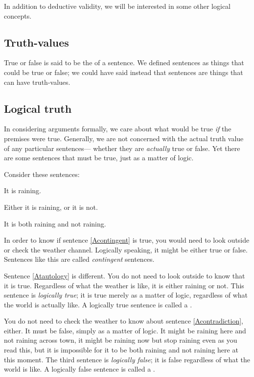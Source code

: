 In addition to deductive validity, we will be interested in some other logical concepts.

\subsection{Truth-values}
True or false is said to be the  of a sentence. We defined sentences as things that could be true or false; we could have said instead that sentences are things that can have truth-values.

\subsection{Logical truth}

In considering arguments formally, we care about what would be true \emph{if} the premises were true. Generally, we are not concerned with the actual truth value of any particular sentences--- whether they are \emph{actually} true or false. Yet there are some sentences that must be true, just as a matter of logic.

Consider these sentences:
\begin{earg}
\item[\ex{Acontingent}] It is raining.
\item[\ex{Atautology}] Either it is raining, or it is not.
\item[\ex{Acontradiction}] It is both raining and not raining.
\end{earg}
In order to know if sentence \ref{Acontingent} is true, you would need to look outside or check the weather channel. Logically speaking, it might be either true or false. Sentences like this are called \emph{contingent} sentences.

Sentence \ref{Atautology} is different. You do not need to look outside to know that it is true. Regardless of what the weather is like, it is either raining or not. This sentence is \emph{logically true}; it is true merely as a matter of logic, regardless of what the world is actually like. A logically true sentence is called a .

You do not need to check the weather to know about sentence \ref{Acontradiction}, either. It must be false, simply as a matter of logic. It might be raining here and not raining across town, it might be raining now but stop raining even as you read this, but it is impossible for it to be both raining and not raining here at this moment. The third sentence is \emph{logically false}; it is false regardless of what the world is like. A logically false sentence is called a .

